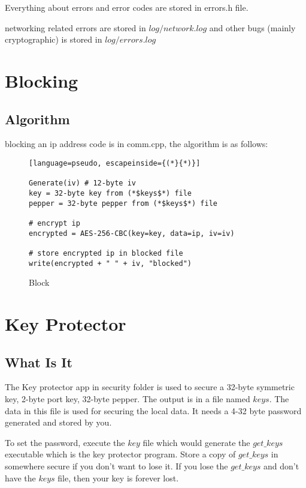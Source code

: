 \documentclass[a4paper,12pt]{article}
\begin{document}
Everything about errors and error codes are stored in errors.h file. 

networking related errors are stored in $log/network.log$ and other bugs (mainly cryptographic) is stored in $log/errors.log$

\section{Blocking}

\subsection{Algorithm}

blocking an ip address code is in comm.cpp, the algorithm is as follows:

\begin{figure}[htb]
\begin{small}
\begin{lstlisting}[language=pseudo, escapeinside={(*}{*)}]

Generate(iv) # 12-byte iv
key = 32-byte key from (*$keys$*) file
pepper = 32-byte pepper from (*$keys$*) file

# encrypt ip
encrypted = AES-256-CBC(key=key, data=ip, iv=iv)

# store encrypted ip in blocked file
write(encrypted + " " + iv, "blocked")

\end{lstlisting}
\end{small}
\caption{Block}\label{blocking}
\end{figure}

\section{Key Protector}


\subsection{What Is It}

The Key protector app in security folder is used to secure a 32-byte symmetric key, 2-byte port key, 32-byte pepper. The output is in a file named $keys$. The data in this file is used for securing the local data. It needs a 4-32 byte password generated and stored by you. 

To set the password, execute the $key$ file which would generate the $get\_keys$ executable which is the key protector program. Store a copy of $get\_keys$ in somewhere secure if you don't want to lose it. If you lose the $get\_keys$ and don't have the $keys$ file, then your key is forever lost.
\end{document}
